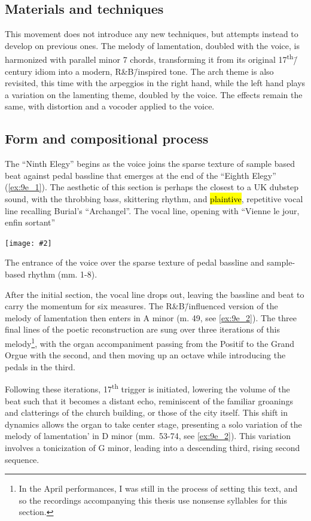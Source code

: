 \documentclass[12pt,twoside,maitrise]{dms_ks}
\newcommand{\customincludeexamples}[4][]{%
    \begin{example}[H]
        \centering
        \texttt{[image: \#2]}
        \caption{#4}
	\label{#3} 
    \end{example}
}
\theoremstyle{definition}
\begin{document}
{\subsection{Materials and techniques}

This movement does not introduce any new techniques, but attempts instead to develop on previous ones.
The melody of lamentation, doubled with the voice, is harmonized with parallel minor 7 chords, transforming it from its original 17\textsuperscript{th}\=/century idiom into a modern, R\&B\=/inspired tone. 
The arch theme is also revisited, this time with the arpeggios in the right hand, while the left hand plays a variation on the lamenting theme, doubled by the voice.
The effects remain the same, with distortion and a vocoder applied to the voice.

\subsection{Form and compositional process}

The “Ninth Elegy” begins as the voice joins the sparse texture of sample based beat against pedal bassline that emerges at the end of the “Eighth Elegy” (\cref{ex:9e_1}). 
The aesthetic of this section is perhaps the closest to a UK dubstep sound, with the throbbing bass, skittering rhythm, and \hl{plaintive}, repetitive vocal line recalling Burial's “Archangel”. 
The vocal line, opening with “Vienne le jour, enfin sortant”

\customincludeexamples[width=\textwidth]{9e_1}{ex:9e_1}{The entrance of the voice over the sparse texture of pedal bassline and sample-based rhythm (mm. 1-8).}

After the initial section, the vocal line drops out, leaving the bassline and beat to carry the momentum for six measures. 
The R\&B\=/influenced version of the melody of lamentation then enters in A minor  (m. 49, see \cref{ex:9e_2}). 
The three final lines of the poetic reconstruction are sung over three iterations of this melody\footnote{In the April performances, I was still in the process of setting this text, and so the recordings accompanying this thesis use nonsense syllables for this section.}, with the organ accompaniment passing from the Positif to the Grand Orgue with the second, and then moving up an octave while introducing the pedals in the third.

Following these iterations, 17\textsuperscript{th} trigger is initiated, lowering the volume of the beat such that it becomes a distant echo, reminiscent of the familiar groanings and clatterings of the church building, or those of the city itself. 
This shift in dynamics allows the organ to take center stage, presenting a solo variation of the melody of lamentation' in D minor (mm.~53-74, see \cref{ex:9e_2}). 
This variation involves a tonicization of G minor, leading into a descending third, rising second sequence.

}
\end{document}
